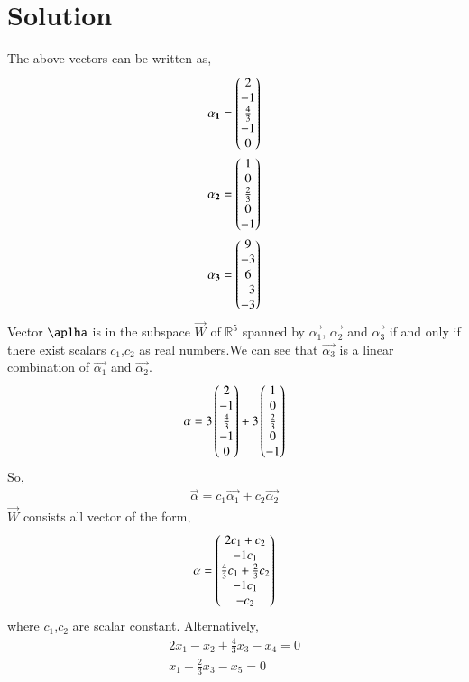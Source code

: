 \documentclass[journal,12pt,twocolumn]{IEEEtran}
\begin{document}
   \section{\textbf{Solution}}
   The above vectors can be written as,
   \begin{align}
   \mathbf{\alpha_1}=\begin{pmatrix}2\\-1\\\frac{4}{3}\\-1\\0\end{pmatrix}\\
   \mathbf{\alpha_2}=\begin{pmatrix}1\\0\\\frac{2}{3}\\0\\-1\end{pmatrix}\\
   \mathbf{\alpha_3}=\begin{pmatrix}9\\-3\\6\\-3\\-3\end{pmatrix}
   \end{align}
   Vector $\aplha$ is in the subspace $\vec{W}$ of $\mathbb{R}^5$ spanned by $\vec{\alpha_1}$, $\vec{\alpha_2}$ and $ \vec{\alpha_3}$ if and only if there exist scalars $c_1$,$c_2$ as real numbers.We can see that $\vec{\alpha_3}$ is a linear combination of $\vec{\alpha_1}$ and $\vec{\alpha_2}$.
   \begin{align}
   \mathbf{\alpha}=3\begin{pmatrix}2\\-1\\\frac{4}{3}\\-1\\0\end{pmatrix}+3\begin{pmatrix}1\\0\\\frac{2}{3}\\0\\-1\end{pmatrix}
   \end{align}
    So,
    \begin{align}
   \vec{\alpha}=c_1\vec{\alpha_1}+c_2\vec{\alpha_2}
   \end{align}
   $\vec{W}$ consists all vector of the form,
   \begin{align}
   \mathbf{\alpha}=\begin{pmatrix}2c_1+c_2\\-1c_1\\\frac{4}{3}c_1+\frac{2}{3}c_2\\-1c_1\\-c_2\end{pmatrix}
   \end{align}
   where $c_1$,$c_2$  are scalar constant. Alternatively,
   \begin{align}
   2x_1-x_2+\frac{4}{3}x_3-x_4=0\\
   x_1+\frac{2}{3}x_3-x_5=0
   \end{align}
\end{document}

